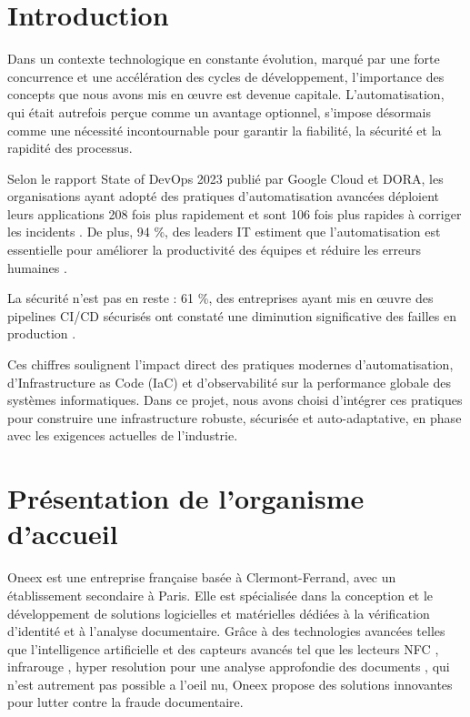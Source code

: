 \section{Introduction}

Dans un contexte technologique en constante évolution, marqué par une forte concurrence et une accélération des cycles de développement, l’importance des concepts que nous avons mis en œuvre est devenue capitale. L’automatisation, qui était autrefois perçue comme un avantage optionnel, s’impose désormais comme une nécessité incontournable pour garantir la fiabilité, la sécurité et la rapidité des processus.

Selon le rapport State of DevOps 2023 publié par Google Cloud et DORA, les organisations ayant adopté des pratiques d’automatisation avancées déploient leurs applications 208 fois plus rapidement et sont 106 fois plus rapides à corriger les incidents \cite{dora2023}. De plus, 94 \%, des leaders IT estiment que l’automatisation est essentielle pour améliorer la productivité des équipes et réduire les erreurs humaines \cite{redhat2023}.

La sécurité n’est pas en reste : 61 \%, des entreprises ayant mis en œuvre des pipelines CI/CD sécurisés ont constaté une diminution significative des failles en production \cite{gitlab2023}.

Ces chiffres soulignent l’impact direct des pratiques modernes d’automatisation, d’Infrastructure as Code (IaC) et d’observabilité sur la performance globale des systèmes informatiques. Dans ce projet, nous avons choisi d’intégrer ces pratiques pour construire une infrastructure robuste, sécurisée et auto-adaptative, en phase avec les exigences actuelles de l’industrie.

\section{Présentation de l'organisme d'accueil}

Oneex est une entreprise française basée à Clermont-Ferrand, avec un établissement secondaire à Paris. Elle est spécialisée dans la conception et le développement de solutions logicielles et matérielles dédiées à la vérification d’identité et à l’analyse documentaire. Grâce à des technologies avancées telles que l’intelligence artificielle et des capteurs avancés tel que les lecteurs NFC , infrarouge , hyper resolution pour une analyse approfondie des documents , qui n'est autrement pas possible a l'oeil nu, Oneex propose des solutions innovantes pour lutter contre la fraude documentaire.

